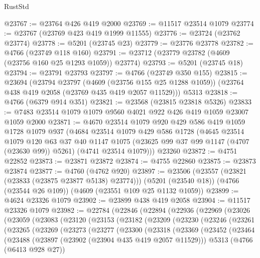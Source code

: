 \begin{lexlean}{RustStd}
\begin{coremodule}
{\begin{coremodule}
{{{{{{{{{{{{{{{{{{{{{{{{{{{{{{{{{{{@23767 := @23764 @426 @419 @2000
@23769 := @11517 @23514 @1079
@23774 := @23767 (@23769 @423 @419 @1999 @11555)
@23776 := @23724 (@23762 @23774)
@23778 := @5201 (@23745 @23)
@23779 := @23776 @23778
@23782 := @4766 (@23749 @118 @160)
@23791 := @23712 (@23779 @23782 (@4609 (@23756 @160 @25 @1293 @1059)) @23774)
@23793 := @5201 (@23745 @18)
@23794 := @23791 @23793
@23797 := @4766 (@23749 @350 @155)
@23815 := @23694
    (@23794
      @23797
      (@4609 (@23756 @155 @25 @1288 @1059))
      (@23764 @438 @419 @2058 (@23769 @435 @419 @2057 @11529)))
    @5313
@23818 := @4766 (@6379 @914 @351)
@23821 := @23568 (@23815 @23818 @5326)
@23833 := @7483 @23514 @1079 @1079 @9560 @4021 @922 @426 @419 @1059 @23007 @1059 @2000
@23871 := @4670
    @23514
    @1079
    @920
    @429
    @586
    @419
    @1059
    @1728
    @1079
    @937
    (@4684
      @23514
      @1079
      @429
      @586
      @1728
      (@4645
        @23514
        @1079
        @120
        @63
        @37
        @40
        @1147
        @1075
        (@23625 @99 @37 @99 @1147 (@4707 (@23630 @99)) @5261)
        (@4741 @23514 @1079)))
    @23260
@23872 := @4751 @22852
@23873 := @23871 @23872
@23874 := @4755 @22860
@23875 := @23873 @23874
@23877 := @4760 (@4762 @920)
@23897 := @23506
    (@23557 (@23821 (@23833 (@23875 @23877 @5138) @23774)))
    (@5201 (@23540 @18))
    (@4766 (@23544 @26 @109))
    (@4609 (@23551 @109 @25 @1132 @1059))
@23899 := @4624 @23326 @1079
@23902 := @23899 @438 @419 @2058
@23904 := @11517 @23326 @1079
@23982 := @22784
    (@22846
      (@22894
        (@22936
          (@22969
            (@23026
              (@23059
                (@23083
                  (@23120
                    (@23153
                      (@23182
                        (@23209
                          (@23230
                            (@23246
                              (@23261
                                (@23265
                                  (@23269
                                    (@23273
                                      (@23277
                                        (@23300
                                          (@23318
                                            (@23369
                                              (@23452
                                                (@23464
                                                  (@23488
                                                    (@23897
                                                      (@23902 (@23904 @435 @419 @2057 @11529)))
                                                    @5313
                                                    (@4766 (@6413 @928 @27))
}}}}}}}}}}}}}}}}}}}}}}}}}}}}}}}}}}}
\end{coremodule}}
\end{coremodule}
\end{lexlean}
